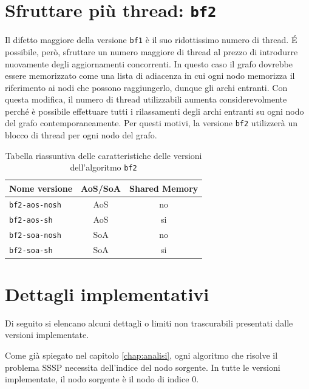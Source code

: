 \documentclass[12pt,a4paper,oneside]{book}
\begin{document}
	\section{Sfruttare più thread: \texttt{bf2}}
	Il difetto maggiore della versione \texttt{bf1} è il suo ridottissimo numero di thread. \'E possibile, però, sfruttare un numero maggiore di thread al prezzo di introdurre nuovamente degli aggiornamenti concorrenti. In questo caso il grafo dovrebbe essere memorizzato come una lista di adiacenza in cui ogni nodo memorizza il riferimento ai nodi che possono raggiungerlo, dunque gli archi entranti. Con questa modifica, il numero di thread utilizzabili aumenta considerevolmente perché è possibile effettuare tutti i rilassamenti degli archi entranti su ogni nodo del grafo contemporaneamente. Per questi motivi, la versione \texttt{bf2} utilizzerà un blocco di thread per ogni nodo del grafo.

	\begin{table}[!ht]
		\centering
		\begin{tabular}{|l|c|c|}
			\hline
			\textbf{Nome versione} & \textbf{AoS/SoA} & \textbf{Shared Memory} \\ \hline
			\texttt{bf2-aos-nosh}  & AoS & no \\ \hline
			\texttt{bf2-aos-sh}    & AoS & si \\ \hline
			\texttt{bf2-soa-nosh}  & SoA & no \\ \hline
			\texttt{bf2-soa-sh}    & SoA & si \\ \hline
		\end{tabular}
		\label{tab:riassunto_bf2}
		\caption{Tabella riassuntiva delle caratteristiche delle versioni dell'algoritmo \texttt{bf2}}
	\end{table}
	
	\section{Dettagli implementativi}
	\label{section:impl}
	Di seguito si elencano alcuni dettagli o limiti non trascurabili presentati dalle versioni implementate.
	
	Come già spiegato nel capitolo \ref{chap:analisi}, ogni algoritmo che risolve il problema SSSP necessita dell'indice del nodo sorgente. In tutte le versioni implementate, il nodo sorgente è il nodo di indice $0$.
	
\end{document}
